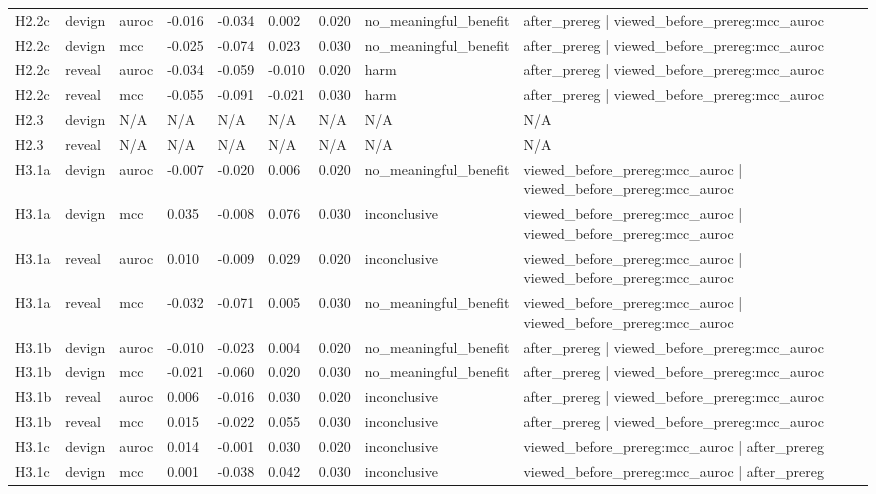 \begin{tabular}{lllllllll}
H2.2c & devign & auroc & -0.016 & -0.034 & 0.002 & 0.020 & no\_meaningful\_benefit & after\_prereg | viewed\_before\_prereg:mcc\_auroc \\
H2.2c & devign & mcc & -0.025 & -0.074 & 0.023 & 0.030 & no\_meaningful\_benefit & after\_prereg | viewed\_before\_prereg:mcc\_auroc \\
H2.2c & reveal & auroc & -0.034 & -0.059 & -0.010 & 0.020 & harm & after\_prereg | viewed\_before\_prereg:mcc\_auroc \\
H2.2c & reveal & mcc & -0.055 & -0.091 & -0.021 & 0.030 & harm & after\_prereg | viewed\_before\_prereg:mcc\_auroc \\
H2.3 & devign & N/A & N/A & N/A & N/A & N/A & N/A & N/A \\
H2.3 & reveal & N/A & N/A & N/A & N/A & N/A & N/A & N/A \\
H3.1a & devign & auroc & -0.007 & -0.020 & 0.006 & 0.020 & no\_meaningful\_benefit & viewed\_before\_prereg:mcc\_auroc | viewed\_before\_prereg:mcc\_auroc \\
H3.1a & devign & mcc & 0.035 & -0.008 & 0.076 & 0.030 & inconclusive & viewed\_before\_prereg:mcc\_auroc | viewed\_before\_prereg:mcc\_auroc \\
H3.1a & reveal & auroc & 0.010 & -0.009 & 0.029 & 0.020 & inconclusive & viewed\_before\_prereg:mcc\_auroc | viewed\_before\_prereg:mcc\_auroc \\
H3.1a & reveal & mcc & -0.032 & -0.071 & 0.005 & 0.030 & no\_meaningful\_benefit & viewed\_before\_prereg:mcc\_auroc | viewed\_before\_prereg:mcc\_auroc \\
H3.1b & devign & auroc & -0.010 & -0.023 & 0.004 & 0.020 & no\_meaningful\_benefit & after\_prereg | viewed\_before\_prereg:mcc\_auroc \\
H3.1b & devign & mcc & -0.021 & -0.060 & 0.020 & 0.030 & no\_meaningful\_benefit & after\_prereg | viewed\_before\_prereg:mcc\_auroc \\
H3.1b & reveal & auroc & 0.006 & -0.016 & 0.030 & 0.020 & inconclusive & after\_prereg | viewed\_before\_prereg:mcc\_auroc \\
H3.1b & reveal & mcc & 0.015 & -0.022 & 0.055 & 0.030 & inconclusive & after\_prereg | viewed\_before\_prereg:mcc\_auroc \\
H3.1c & devign & auroc & 0.014 & -0.001 & 0.030 & 0.020 & inconclusive & viewed\_before\_prereg:mcc\_auroc | after\_prereg \\
H3.1c & devign & mcc & 0.001 & -0.038 & 0.042 & 0.030 & inconclusive & viewed\_before\_prereg:mcc\_auroc | after\_prereg \\

\end{tabular}

